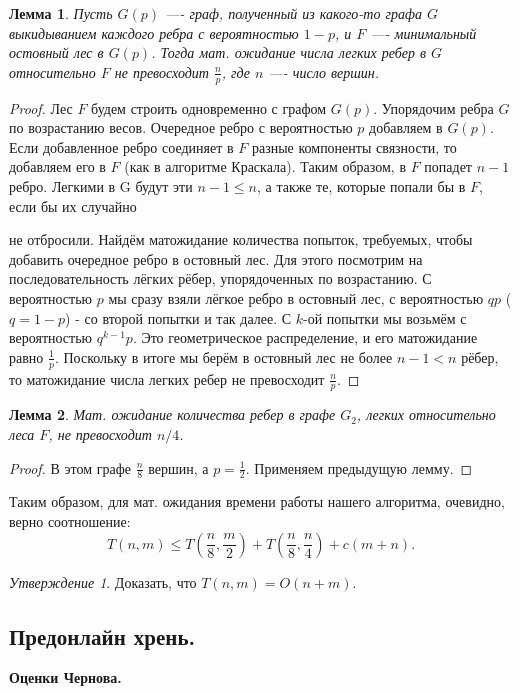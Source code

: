 \documentclass[a4paper]{article}
\theoremstyle{indented}
\newtheorem{lemma}{Лемма}
\theoremstyle{definition}
\theoremstyle{remark}
\newtheorem{stat}{Утверждение}
\begin{document}
\begin{lemma}
Пусть $G(p)$ —- граф, полученный из какого-то графа $G$
выкидыванием каждого ребра с вероятностью $1-p$, и $F$ —-
минимальный остовный лес в $G(p)$. Тогда мат. ожидание числа
легких ребер в $G$ относительно $F$ не превосходит $\frac{n}{p}$,
где $n$ —- число вершин.
\end{lemma}
\begin{proof}
Лес $F$ будем строить одновременно с графом $G(p)$. Упорядочим ребра
$G$ по возрастанию весов. Очередное ребро с вероятностью $p$
добавляем в $G(p)$. Если добавленное ребро соединяет в $F$ разные
компоненты связности, то добавляем его в $F$ (как в алгоритме
Краскала). Таким образом, в $F$ попадет $n-1$ ребро. Легкими
в G будут эти $n-1\leq n$, а также те, которые попали бы в $F$, если
бы их случайно
 
не отбросили. Найдём матожидание количества попыток, требуемых, чтобы добавить очередное ребро в остовный лес. Для этого посмотрим на последовательность лёгких рёбер, упорядоченных по возрастанию. С вероятностью $p$ мы сразу взяли лёгкое ребро в остовный лес, с вероятностью $qp$ ($q=1-p$) - со второй попытки и так далее. С $k$-ой попытки мы возьмём с вероятностью $q^{k-1}p$. Это геометрическое распределение, и его матожидание равно $\frac{1}{p}$. Поскольку в итоге мы берём в остовный лес не более $n-1<n$ рёбер, то матожидание числа легких ребер не превосходит $\frac{n}{p}$.
\end{proof}

\begin{lemma}
Мат. ожидание количества ребер в графе $G_2$, легких относительно
леса $F$, не превосходит $n/4$.
\end{lemma}
\begin{proof}
В этом графе $\frac{n}{8}$ вершин, а $p=\frac{1}{2}$. Применяем
предыдущую лемму.
\end{proof}
Таким образом, для мат. ожидания времени работы нашего алгоритма,
очевидно, верно соотношение: $$ T(n,m)\leq
T\left(\frac{n}{8},\frac{m}{2}\right)+
T\left(\frac{n}{8},\frac{n}{4}\right)+c(m+n). $$

\begin{stat}
Доказать, что $T(n,m)=O(n+m)$.
\end{stat}

\subsection{Предонлайн хрень.}

\textbf{Оценки Чернова.} \\
\end{document}
